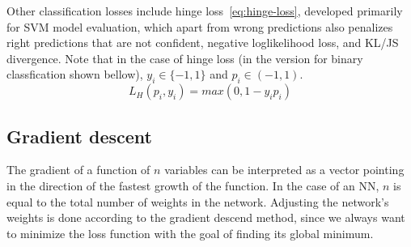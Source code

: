Other classification losses include hinge loss~\eqref{eq:hinge-loss}, developed primarily for SVM model evaluation,
which apart from wrong predictions also penalizes right predictions that are not confident,
negative loglikelihood loss, and KL/JS divergence.
Note that in the case of hinge loss (in the version for binary classfication shown bellow),
$y_i \in \{-1,1\}$ and $p_i \in (-1,1)$.
\begin{equation}
\label{eq:hinge-loss}
    L_H(p_i, y_i) = max(0, 1 - y_i p_i)
\end{equation}


\subsection*{Gradient descent}
\label{gradient-descent}
The gradient of a function of $n$ variables can be interpreted as a vector pointing
in the direction of the fastest growth of the function. In the case of an NN, $n$ is equal
to the total number of weights in the network. Adjusting the network's weights
is done according to the gradient descend method, since we always want to minimize the loss function
with the goal of finding its global minimum.

